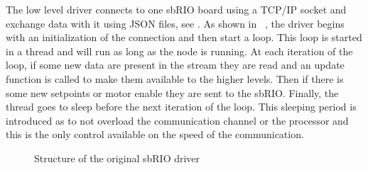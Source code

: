 The low level driver connects to one sbRIO board using a TCP/IP socket and exchange data with it using \gls{JSON} files, see . As shown in ~, the driver begins with an initialization of the connection and then start a loop. This loop is started in a thread and will run as long as the node is running. At each iteration of the loop, if some new data are present in the stream they are read and an update function is called to make them available to the higher levels. Then if there is some new setpoints or motor enable they are sent to the sbRIO. Finally, the thread goes to sleep before the next iteration of the loop. This sleeping period is introduced as to not overload the communication channel or the processor and this is the only control available on the speed of the communication.
\begin{figure}[H]
\centering
{}
\caption{Structure of the original sbRIO driver}
\label{fig:original_driver}
\end{figure}


